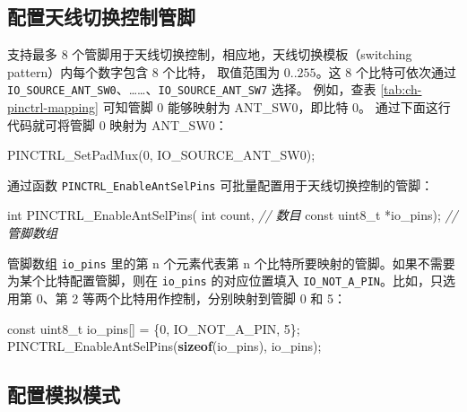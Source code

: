 \documentclass[
  12pt,
]{book}
\newenvironment{Shaded}{\begin{snugshade}}{\end{snugshade}}
\newcommand{\CommentTok}[1]{\textcolor[rgb]{0.56,0.35,0.01}{\textit{#1}}}
\newcommand{\DataTypeTok}[1]{\textcolor[rgb]{0.13,0.29,0.53}{#1}}
\newcommand{\DecValTok}[1]{\textcolor[rgb]{0.00,0.00,0.81}{#1}}
\newcommand{\KeywordTok}[1]{\textcolor[rgb]{0.13,0.29,0.53}{\textbf{#1}}}
\newcommand{\NormalTok}[1]{#1}
\begin{document}
\hypertarget{ux914dux7f6eux5929ux7ebfux5207ux6362ux63a7ux5236ux7ba1ux811a}{%
\subsection{配置天线切换控制管脚}\label{ux914dux7f6eux5929ux7ebfux5207ux6362ux63a7ux5236ux7ba1ux811a}}

支持最多 8 个管脚用于天线切换控制，相应地，天线切换模板（switching pattern）内每个数字包含 8 个比特，
取值范围为 \(0..255\)。这 8 个比特可依次通过 \texttt{IO\_SOURCE\_ANT\_SW0}、\ldots\ldots、\texttt{IO\_SOURCE\_ANT\_SW7} 选择。
例如，查表 \ref{tab:ch-pinctrl-mapping} 可知管脚 0 能够映射为 ANT\_SW0，即比特 0。
通过下面这行代码就可将管脚 0 映射为 ANT\_SW0：

\begin{Shaded}
\begin{Highlighting}[]
\NormalTok{PINCTRL_SetPadMux(}\DecValTok{0}\NormalTok{, IO_SOURCE_ANT_SW0);}
\end{Highlighting}
\end{Shaded}

通过函数 \texttt{PINCTRL\_EnableAntSelPins} 可批量配置用于天线切换控制的管脚：

\begin{Shaded}
\begin{Highlighting}[]
\DataTypeTok{int}\NormalTok{ PINCTRL_EnableAntSelPins(}
  \DataTypeTok{int}\NormalTok{ count,                }\CommentTok{// 数目}
  \DataTypeTok{const} \DataTypeTok{uint8_t}\NormalTok{ *io_pins);  }\CommentTok{// 管脚数组}
\end{Highlighting}
\end{Shaded}

管脚数组 \texttt{io\_pins} 里的第 n 个元素代表第 n 个比特所要映射的管脚。如果不需要为某个比特配置管脚，则在 \texttt{io\_pins}
的对应位置填入 \texttt{IO\_NOT\_A\_PIN}。比如，只选用第 0、第 2 等两个比特用作控制，分别映射到管脚 0 和 5：

\begin{Shaded}
\begin{Highlighting}[]
\DataTypeTok{const} \DataTypeTok{uint8_t}\NormalTok{ io_pins[] = \{}\DecValTok{0}\NormalTok{, IO_NOT_A_PIN, }\DecValTok{5}\NormalTok{\};}
\NormalTok{PINCTRL_EnableAntSelPins(}\KeywordTok{sizeof}\NormalTok{(io_pins), io_pins);}
\end{Highlighting}
\end{Shaded}

\hypertarget{pinctrl-config-analog}{%
\subsection{配置模拟模式}\label{pinctrl-config-analog}}
\end{document}
